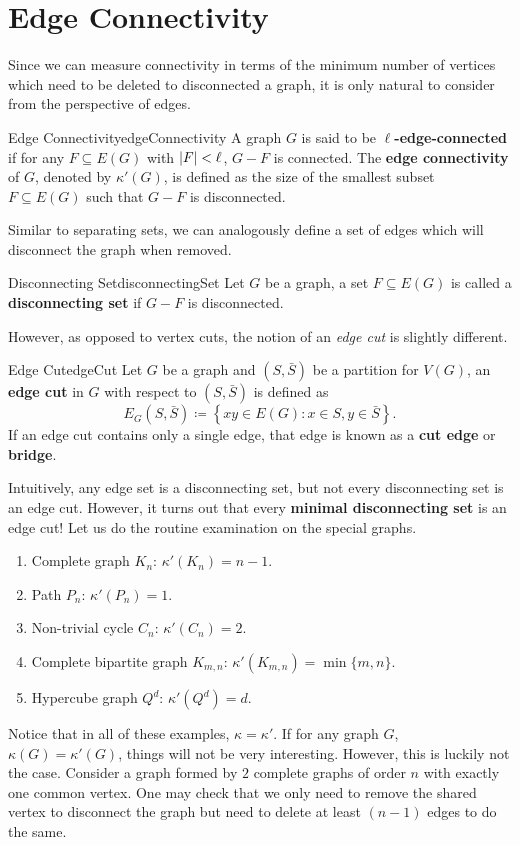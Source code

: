 \documentclass[math, code]{amznotes}
\theoremstyle{remark}
\begin{document}
\section{Edge Connectivity}
Since we can measure connectivity in terms of the minimum number of vertices which need to be deleted to disconnected a graph, it is only natural to consider from the perspective of edges.
\begin{dfnbox}{Edge Connectivity}{edgeConnectivity}
    A graph $G$ is said to be {\color{red} \textbf{$\ell$-edge-connected}} if for any $F \subseteq E(G)$ with ${\left\lvert {F} \right\rvert} < \ell$, $G - F$ is connected. The {\color{red} \textbf{edge connectivity}} of $G$, denoted by $\kappa'(G)$, is defined as the size of the smallest subset $F \subseteq E(G)$ such that $G - F$ is disconnected.
\end{dfnbox}
Similar to separating sets, we can analogously define a set of edges which will disconnect the graph when removed.
\begin{dfnbox}{Disconnecting Set}{disconnectingSet}
    Let $G$ be a graph, a set $F \subseteq E(G)$ is called a {\color{red} \textbf{disconnecting set}} if $G - F$ is disconnected.
\end{dfnbox}
However, as opposed to vertex cuts, the notion of an \textit{edge cut} is slightly different.
\begin{dfnbox}{Edge Cut}{edgeCut}
    Let $G$ be a graph and $\left(S, \bar{S}\right)$ be a partition for $V(G)$, an {\color{red} \textbf{edge cut}} in $G$ with respect to $\left(S, \bar{S}\right)$ is defined as 
    \begin{equation*}
        E_G\left(S, \bar{S}\right) \coloneqq \left\{xy \in E(G) \colon x \in S, y \in \bar{S}\right\}.
    \end{equation*}
    If an edge cut contains only a single edge, that edge is known as a {\color{red} \textbf{cut edge}} or {\color{red} \textbf{bridge}}.
\end{dfnbox}
Intuitively, any edge set is a disconnecting set, but not every disconnecting set is an edge cut. However, it turns out that every \textbf{minimal disconnecting set} is an edge cut! Let us do the routine examination on the special graphs.
\begin{enumerate}
    \item Complete graph $K_n$: $\kappa'(K_n) = n - 1$.
    \item Path $P_n$: $\kappa'(P_n) = 1$.
    \item Non-trivial cycle $C_n$: $\kappa'(C_n) = 2$.
    \item Complete bipartite graph $K_{m, n}$: $\kappa'(K_{m, n}) = \min\{m, n\}$.
    \item Hypercube graph $Q^d$: $\kappa'\left(Q^d\right) = d$.
\end{enumerate}
Notice that in all of these examples, $\kappa = \kappa'$. If for any graph $G$, $\kappa(G) = \kappa'(G)$, things will not be very interesting. However, this is luckily not the case. Consider a graph formed by $2$ complete graphs of order $n$ with exactly one common vertex. One may check that we only need to remove the shared vertex to disconnect the graph but need to delete at least $(n - 1)$ edges to do the same.
\end{document}
